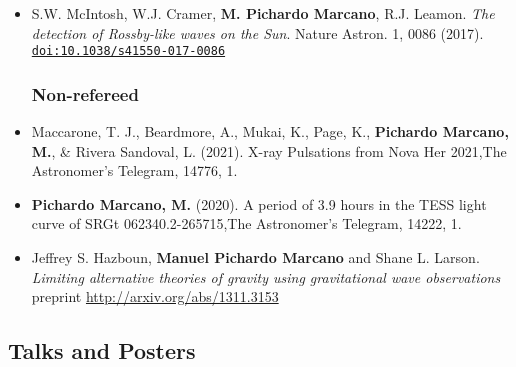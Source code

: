 \documentclass[letterpaper,10pt]{article}
\begin{document}
\begin{itemize}[label=$\blacktriangleright$]
\item  S.W. McIntosh, W.J. Cramer, \textbf{M. Pichardo Marcano}, R.J. Leamon. \emph{The detection of Rossby-like waves on the Sun}. Nature Astron. 1, 0086 (2017). \href{http://dx.doi.org/10.1038/s41550-017-0086}{\tt doi:10.1038/s41550-017-0086} \\

\subsubsection*{Non-refereed}

\item Maccarone, T. J., Beardmore, A., Mukai, K., Page, K., \textbf{Pichardo Marcano, M.}, \& Rivera Sandoval, L. (2021). X-ray Pulsations from Nova Her 2021,The Astronomer's Telegram, 14776, 1.



\item \textbf{Pichardo Marcano, M.} (2020). A period of 3.9 hours in the TESS light curve of SRGt 062340.2-265715,The Astronomer's Telegram, 14222, 1.

\item  Jeffrey S. Hazboun, \textbf{Manuel Pichardo Marcano} and Shane L. Larson. \emph{Limiting alternative theories of gravity using gravitational wave observations} \\
 preprint \url{http://arxiv.org/abs/1311.3153} \\


\end{itemize}

\subsection*{Talks and Posters}
\end{document}
